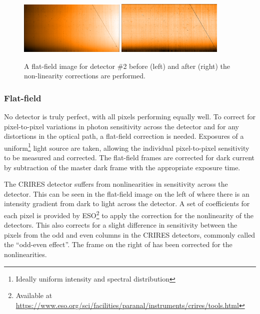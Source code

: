 \begin{figure}[h]
    \centering
        \includegraphics[width=0.45\textwidth]{figures/reduction/Flat_2.png} %
        \includegraphics[width=0.45\textwidth]{figures/reduction/FlatR_2.png} %
    \caption{A flat-field image for detector \#2 before (left) and after (right) the non-linearity corrections are performed.}
    \label{fig:masterflats_colour}
\end{figure}


\subsubsection{Flat-field}
\label{subsec:flat-field}
No detector is truly perfect, with all pixels performing equally well.
To correct for pixel-to-pixel variations in photon sensitivity across the detector and for any distortions in the optical path, a flat-field correction is needed.
Exposures of a uniform\footnote{Ideally uniform intensity and spectral distribution} light source are taken, allowing the individual pixel-to-pixel sensitivity to be measured and corrected.
The flat-field frames are corrected for dark current by subtraction of the master dark frame with the appropriate exposure time.

The {CRIRES} detector suffers from nonlinearities in sensitivity across the detector.
This can be seen in the flat-field image on the left of  where there is an intensity gradient from dark to light across the detector.
A set of coefficients for each pixel is provided by {ESO}\footnote{Available at \href{https://www.eso.org/sci/facilities/paranal/instruments/crires/tools.html}{https://www.eso.org/sci/facilities/paranal/instruments/crires/tools.html}} to apply the correction for the nonlinearity of the detectors.
This also corrects for a slight difference in sensitivity between the pixels from the odd and even columns in the {CRIRES} detectors, commonly called the ``odd-even effect''.
The frame on the right of  has been corrected for the nonlinearities.

